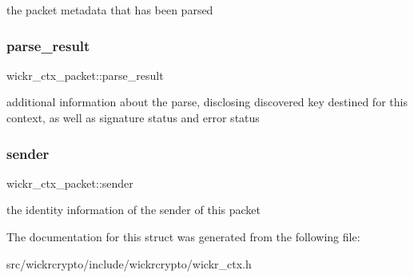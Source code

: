the packet metadata that has been parsed \mbox{\label{structwickr__ctx__packet_a7bc4643a99b787536ee8b7505412ecce}} 
\subsubsection{\texorpdfstring{parse\+\_\+result}{parse\_result}}
{\footnotesize\ttfamily wickr\+\_\+ctx\+\_\+packet\+::parse\+\_\+result}

additional information about the parse, disclosing discovered key destined for this context, as well as signature status and error status \mbox{\label{structwickr__ctx__packet_ac57d2b0f48fc3dad5b72d408e30b7b8b}} 
\subsubsection{\texorpdfstring{sender}{sender}}
{\footnotesize\ttfamily wickr\+\_\+ctx\+\_\+packet\+::sender}

the identity information of the sender of this packet 

The documentation for this struct was generated from the following file\+:\begin{DoxyCompactItemize}
\item 
src/wickrcrypto/include/wickrcrypto/wickr\+\_\+ctx.\+h\end{DoxyCompactItemize}
